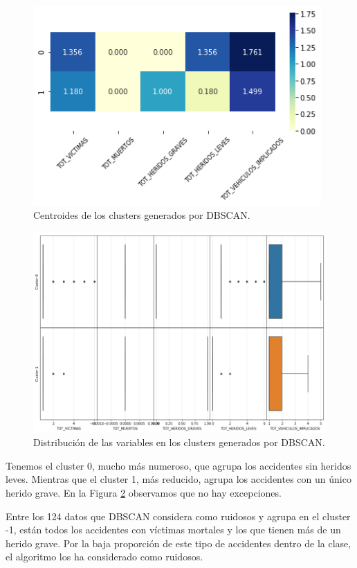 \documentclass[oneside]{book}
\begin{document}
\begin{figure}[H]
  \centering
  \includegraphics[width=110mm]{figures/accidentes/dbscan3centroids}
  \caption{Centroides de los clusters generados por DBSCAN.}
  \label{fig:dbscan3centroids}
\end{figure}

\begin{figure}[H]
  \centering
  \includegraphics[width=140mm]{figures/accidentes/dbscan3distribution}
  \caption{Distribución de las variables en los clusters generados por
    DBSCAN.}
  \label{fig:dbscan3distribution}
\end{figure}

Tenemos el cluster 0, mucho más numeroso, que agrupa los accidentes
sin heridos leves. Mientras que el cluster 1, más reducido, agrupa los
accidentes con un único herido grave. En la Figura
\ref{fig:dbscan3distribution} observamos que no hay excepciones.

Entre los 124 datos que DBSCAN considera como ruidosos y agrupa en el
cluster -1, están todos los accidentes con víctimas mortales y los que
tienen más de un herido grave. Por la baja proporción de este tipo de
accidentes dentro de la clase, el algoritmo los ha considerado como
ruidosos.
\end{document}
